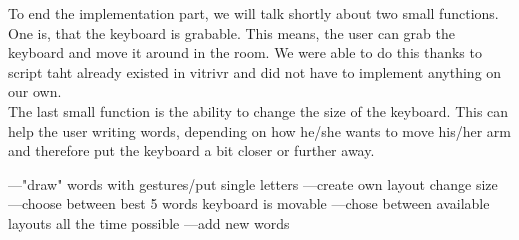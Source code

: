 To end the implementation part, we will talk shortly about two small functions. One is, that the keyboard is grabable. This means, the user can grab the keyboard and move it around in the room. We were able to do this thanks to script taht already existed in vitrivr and did not have to implement anything on our own.\\
The last small function is the ability to change the size of the keyboard. This can help the user writing words, depending on how he/she wants to move his/her arm and therefore put the keyboard a bit closer or further away.



---"draw" words with gestures/put single letters
---create own layout
change size
---choose between best 5 words
keyboard is movable
---chose between available layouts all the time possible
---add new words
